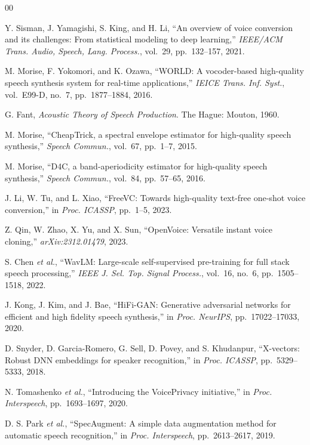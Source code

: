 \documentclass[conference]{IEEEtran}
\begin{document}
\begin{thebibliography}{00}

Y. Sisman, J. Yamagishi, S. King, and H. Li,
``An overview of voice conversion and its challenges:
From statistical modeling to deep learning,''
\textit{IEEE/ACM Trans. Audio, Speech, Lang. Process.},
vol.~29, pp.~132--157, 2021.

M. Morise, F. Yokomori, and K. Ozawa,
``WORLD: A vocoder-based high-quality speech synthesis system
for real-time applications,''
\textit{IEICE Trans. Inf. Syst.},
vol.~E99-D, no.~7, pp.~1877--1884, 2016.

G. Fant,
\textit{Acoustic Theory of Speech Production}.
The Hague: Mouton, 1960.

M. Morise,
``CheapTrick, a spectral envelope estimator for high-quality
speech synthesis,''
\textit{Speech Commun.},
vol.~67, pp.~1--7, 2015.

M. Morise,
``D4C, a band-aperiodicity estimator for high-quality
speech synthesis,''
\textit{Speech Commun.},
vol.~84, pp.~57--65, 2016.

J. Li, W. Tu, and L. Xiao,
``FreeVC: Towards high-quality text-free one-shot voice conversion,''
in \textit{Proc. ICASSP}, pp.~1--5, 2023.

Z. Qin, W. Zhao, X. Yu, and X. Sun,
``OpenVoice: Versatile instant voice cloning,''
\textit{arXiv:2312.01479}, 2023.

S. Chen \textit{et al.},
``WavLM: Large-scale self-supervised pre-training for full stack
speech processing,''
\textit{IEEE J. Sel. Top. Signal Process.},
vol.~16, no.~6, pp.~1505--1518, 2022.

J. Kong, J. Kim, and J. Bae,
``HiFi-GAN: Generative adversarial networks for efficient and
high fidelity speech synthesis,''
in \textit{Proc. NeurIPS}, pp.~17022--17033, 2020.

D. Snyder, D. Garcia-Romero, G. Sell, D. Povey, and S. Khudanpur,
``X-vectors: Robust DNN embeddings for speaker recognition,''
in \textit{Proc. ICASSP}, pp.~5329--5333, 2018.

N. Tomashenko \textit{et al.},
``Introducing the VoicePrivacy initiative,''
in \textit{Proc. Interspeech}, pp.~1693--1697, 2020.

D. S. Park \textit{et al.},
``SpecAugment: A simple data augmentation method for automatic
speech recognition,''
in \textit{Proc. Interspeech}, pp.~2613--2617, 2019.

\end{thebibliography}
\end{document}
